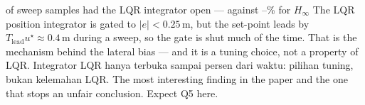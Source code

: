 \documentclass[aspectratio=169,11pt,t]{beamer}
\begin{document}
\begin{frame}
  \bignum{\IntegWinLqrMin--\IntegWinLqrMax\%}
    {of sweep samples had the LQR integrator open --- against
     \IntegWinHinfMin--\IntegWinHinfMax\% for $H_\infty$}
    {The LQR position integrator is gated to $|e|<0.25$\,m, but the set-point
     leads by $T_{\mathrm{lead}}u^\star\approx0.4$\,m during a sweep, so the gate
     is shut much of the time. That is the mechanism behind the lateral bias ---
     and it is a tuning choice, not a property of LQR.}
    {Integrator LQR hanya terbuka \IntegWinLqrMin\space sampai \IntegWinLqrMax\space persen dari waktu: pilihan tuning, bukan kelemahan LQR.}
    {The most interesting finding in the paper and the one that stops an
        unfair conclusion. Expect Q5 here.}
\end{frame}
\end{document}
